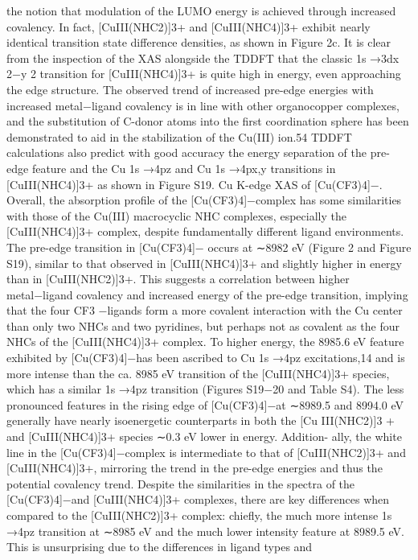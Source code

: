 \documentclass{article}
\begin{document}
the notion that modulation of the LUMO energy is achieved
through increased covalency. In fact, [CuIII(NHC2)]3+ and
[CuIII(NHC4)]3+ exhibit nearly identical transition state
diﬀerence densities, as shown in Figure 2c. It is clear from
the inspection of the XAS alongside the TDDFT that the
classic 1s →3dx
2−y
2 transition for [CuIII(NHC4)]3+ is quite
high in energy, even approaching the edge structure. The
observed trend of increased pre-edge energies with increased
metal−ligand covalency is in line with other organocopper
complexes, and the substitution of C-donor atoms into the ﬁrst
coordination sphere has been demonstrated to aid in the
stabilization of the Cu(III) ion.54 TDDFT calculations also
predict with good accuracy the energy separation of the pre-
edge feature and the Cu 1s →4pz and Cu 1s →4px,y
transitions in [CuIII(NHC4)]3+ as shown in Figure S19.
Cu K-edge XAS of [Cu(CF3)4]−. Overall, the absorption
proﬁle of the [Cu(CF3)4]−complex has some similarities with
those of the Cu(III) macrocyclic NHC complexes, especially
the [CuIII(NHC4)]3+ complex, despite fundamentally diﬀerent
ligand environments. The pre-edge transition in [Cu(CF3)4]−
occurs at ∼8982 eV (Figure 2 and Figure S19), similar to that
observed in [CuIII(NHC4)]3+ and slightly higher in energy
than in [CuIII(NHC2)]3+. This suggests a correlation between
higher metal−ligand covalency and increased energy of the
pre-edge transition, implying that the four CF3
−ligands form a
more covalent interaction with the Cu center than only two
NHCs and two pyridines, but perhaps not as covalent as the
four NHCs of the [CuIII(NHC4)]3+ complex.
To higher energy, the 8985.6 eV feature exhibited by
[Cu(CF3)4]−has been ascribed to Cu 1s →4pz excitations,14
and is more intense than the ca. 8985 eV transition of the
[CuIII(NHC4)]3+ species, which has a similar 1s →4pz
transition (Figures S19−20 and Table S4). The less
pronounced features in the rising edge of [Cu(CF3)4]−at
∼8989.5 and 8994.0 eV generally have nearly isoenergetic
counterparts
in
both
the
[Cu III(NHC2)]3 +
and
[CuIII(NHC4)]3+ species ∼0.3 eV lower in energy. Addition-
ally, the white line in the [Cu(CF3)4]−complex is intermediate
to that of [CuIII(NHC2)]3+ and [CuIII(NHC4)]3+, mirroring
the trend in the pre-edge energies and thus the potential
covalency trend. Despite the similarities in the spectra of the
[Cu(CF3)4]−and [CuIII(NHC4)]3+ complexes, there are key
diﬀerences when compared to the [CuIII(NHC2)]3+ complex:
chieﬂy, the much more intense 1s →4pz transition at ∼8985
eV and the much lower intensity feature at 8989.5 eV. This is
unsurprising due to the diﬀerences in ligand types and
\end{document}
